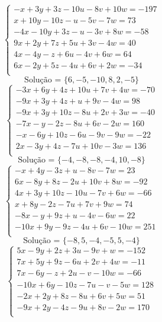 \documentclass[12pt,oneside,a4paper]{article}
\begin{document}
\vspace{\baselineskip}
\begin{equation*}
\begin{cases}
-x+3y+3z-10u-8v+10w=-197 \\
x+10y-10z-u-5v-7w=73 \\
-4x-10y+3z-u-3v+8w=-58 \\
9x+2y+7z+5u+3v-4w=40 \\
4x-4y-z+6u-4v+6w=64 \\
6x-2y+5z-4u+6v+2w=-34 \\
\end{cases}
\end{equation*}
\begin{equation*}
\text{Solução = }\{6,-5,-10,8,2,-5\}
\end{equation*}
\vspace{\baselineskip}
\begin{equation*}
\begin{cases}
-3x+6y+4z+10u+7v+4w=-70 \\
-9x+3y+4z+u+9v-4w=98 \\
-9x+3y+10z-8u+2v+3w=-40 \\
-7x-y-2z-8u+6v-2w=160 \\
-x-6y+10z-6u-9v-9w=-22 \\
2x-3y+4z-7u+10v-3w=136 \\
\end{cases}
\end{equation*}
\begin{equation*}
\text{Solução = }\{-4,-8,-8,-4,10,-8\}
\end{equation*}
\vspace{\baselineskip}
\begin{equation*}
\begin{cases}
-x+4y-3z+u-8v-7w=23 \\
6x-8y+8z-2u+10v+8w=-92 \\
4x+3y+10z-10u-7v+6w=-66 \\
x+8y-2z-7u+7v+9w=74 \\
-8x-y+9z+u-4v-6w=22 \\
-10x+9y-9z-4u+6v-10w=251 \\
\end{cases}
\end{equation*}
\begin{equation*}
\text{Solução = }\{-8,5,-4,-5,5,-4\}
\end{equation*}
\vspace{\baselineskip}
\begin{equation*}
\begin{cases}
5x-9y+2z+3u-9v+w=-152 \\
7x+5y+9z-6u+2v+4w=-11 \\
7x-6y-z+2u-v-10w=-66 \\
-10x+6y-10z-7u-v-5w=128 \\
-2x+2y+8z-8u+6v+5w=51 \\
-9x+2y-4z-9u+8v-2w=170 \\
\end{cases}
\end{equation*}
\end{document}
